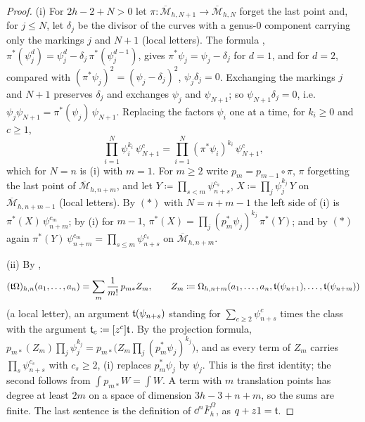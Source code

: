 \begin{proof}
(i) For $2h-2+N>0$ let $\pi\colon\overline{\mathcal M}_{h,N+1}\to\overline{\mathcal M}_{h,N}$ forget the last point and, for $j\leq N$, let $\delta_j$ be the divisor of the curves with a genus-$0$ component carrying only the markings $j$ and $N+1$ (local letters). The formula \cite[(8)]{PPZ15}, $\pi^*(\psi_j^d)=\psi_j^d-\delta_j\,\pi^*(\psi_j^{d-1})$, gives $\pi^*\psi_j=\psi_j-\delta_j$ for $d=1$, and for $d=2$, compared with $(\pi^*\psi_j)^2=(\psi_j-\delta_j)^2$, $\psi_j\delta_j=0$. Exchanging the markings $j$ and $N+1$ preserves $\delta_j$ and exchanges $\psi_j$ and $\psi_{N+1}$; so $\psi_{N+1}\delta_j=0$, i.e.\ $\psi_j\psi_{N+1}=\pi^*(\psi_j)\,\psi_{N+1}$. Replacing the factors $\psi_i$ one at a time, for $k_i\geq0$ and $c\geq1$,
\[
\textstyle\prod_{i=1}^N\psi_i^{k_i}\,\psi_{N+1}^c=\prod_{i=1}^N(\pi^*\psi_i)^{k_i}\,\psi_{N+1}^c,\tag{$*$}
\]
which for $N=n$ is (i) with $m=1$. For $m\geq2$ write $p_m=p_{m-1}\circ\pi$, $\pi$ forgetting the last point of $\overline{\mathcal M}_{h,n+m}$, and let $Y\coloneqq\prod_{s<m}\psi_{n+s}^{c_s}$, $X\coloneqq\prod_j\psi_j^{k_j}\,Y$ on $\overline{\mathcal M}_{h,n+m-1}$ (local letters). By $(*)$ with $N=n+m-1$ the left side of (i) is $\pi^*(X)\,\psi_{n+m}^{c_m}$; by (i) for $m-1$, $\pi^*(X)=\prod_j(p_m^*\psi_j)^{k_j}\,\pi^*(Y)$; and by $(*)$ again $\pi^*(Y)\,\psi_{n+m}^{c_m}=\prod_{s\leq m}\psi_{n+s}^{c_s}$ on $\overline{\mathcal M}_{h,n+m}$.

(ii) By \cite[Def.~2.5]{PPZ15},
\[
(\mathfrak{t}\Omega)_{h,n}(a_1,\dots,a_n)=\sum_m\frac1{m!}\,p_{m*}Z_m,\qquad Z_m\coloneqq\Omega_{h,n+m}(a_1,\dots,a_n,\mathfrak{t}(\psi_{n+1}),\dots,\mathfrak{t}(\psi_{n+m}))
\]
(a local letter), an argument $\mathfrak{t}(\psi_{n+s})$ standing for $\sum_{c\geq2}\psi_{n+s}^c$ times the class with the argument $\mathfrak{t}_c\coloneqq[z^c]\mathfrak{t}$. By the projection formula, $p_{m*}(Z_m)\prod_j\psi_j^{k_j}=p_{m*}\bigl(Z_m\prod_j(p_m^*\psi_j)^{k_j}\bigr)$, and as every term of $Z_m$ carries $\prod_s\psi_{n+s}^{c_s}$ with $c_s\geq2$, (i) replaces $p_m^*\psi_j$ by $\psi_j$. This is the first identity; the second follows from $\int p_{m*}W=\int W$. A term with $m$ translation points has degree at least $2m$ on a space of dimension $3h-3+n+m$, so the sums are finite. The last sentence is the definition of $\dd^n\overline F^\Omega_h$, as $q+z1=\mathfrak{t}$.


\end{proof}
